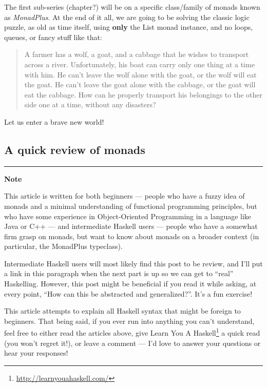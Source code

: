 \documentclass[]{article}
\renewcommand{\href}[2]{#2\footnote{\url{#1}}}
\begin{document}
The first sub-series (chapter?) will be on a specific class/family of monads
known as \emph{MonadPlus}. At the end of it all, we are going to be solving the
classic logic puzzle, as old as time itself, using \textbf{only} the List monad
instance, and no loops, queues, or fancy stuff like that:

\begin{quote}
A farmer has a wolf, a goat, and a cabbage that he wishes to transport across a
river. Unfortunately, his boat can carry only one thing at a time with him. He
can't leave the wolf alone with the goat, or the wolf will eat the goat. He
can't leave the goat alone with the cabbage, or the goat will eat the cabbage.
How can he properly transport his belongings to the other side one at a time,
without any disasters?
\end{quote}

Let us enter a brave new world!

\subsection{A quick review of monads}\label{a-quick-review-of-monads}

\begin{center}\rule{0.5\linewidth}{0.5pt}\end{center}

\textbf{Note}

This article is written for both beginners --- people who have a fuzzy idea of
monads and a minimal understanding of functional programming principles, but who
have some experience in Object-Oriented Programming in a language like Java or
C++ --- and intermediate Haskell users --- people who have a somewhat firm grasp
on monads, but want to know about monads on a broader context (in particular,
the MonadPlus typeclass).

Intermediate Haskell users will most likely find this post to be review, and
I'll put a link in this paragraph when the next part is up so we can get to
``real'' Haskelling. However, this post might be beneficial if you read it while
asking, at every point, ``How can this be abstracted and generalized?''. It's a
fun exercise!

This article attempts to explain all Haskell syntax that might be foreign to
beginners. That being said, if you ever run into anything you can't understand,
feel free to either read the articles above, give
\href{http://learnyouahaskell.com/}{Learn You A Haskell} a quick read (you won't
regret it!), or leave a comment --- I'd love to answer your questions or hear
your responses!
\end{document}
